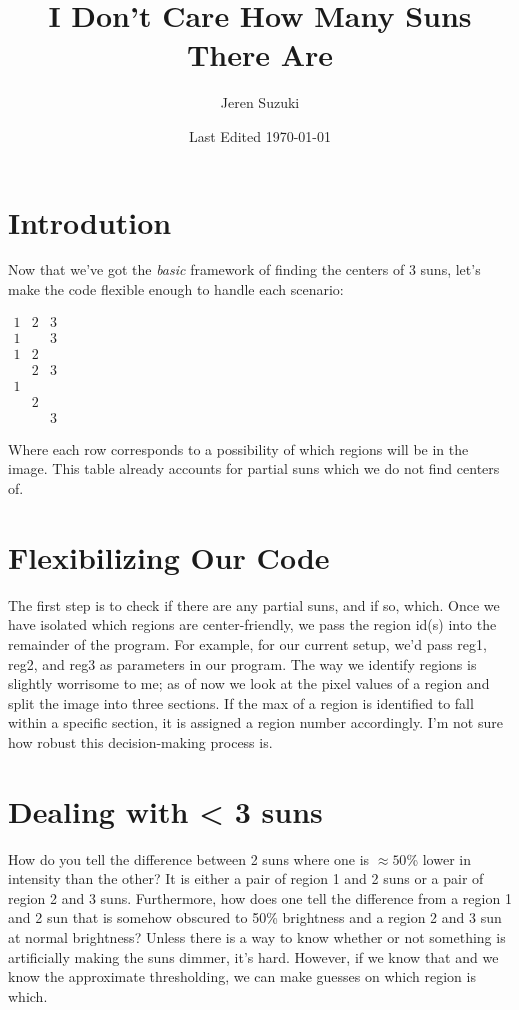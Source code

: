 \documentclass[10pt]{scrartcl}
\title{I Don't Care How Many Suns There Are}
\author{Jeren Suzuki}
\date{Last Edited \today}
\begin{document}
\maketitle
{}
\tableofcontents
\clearpage
{}

\section{Introdution} %
\label{sec:introdution}
    Now that we've got the \emph{basic} framework of finding the centers of 3 suns, let's make the code flexible enough to handle each scenario:\\
\begin{center}
    $\begin{matrix} 
    1 & 2 & 3 \\ 
    1 &   & 3 \\
    1 & 2 &   \\
      & 2 & 3 \\
    1 &   &   \\
      & 2 &   \\
      &   & 3
    \end{matrix}$
\end{center}

Where each row corresponds to a possibility of which regions will be in the image. This table already accounts for partial suns which we do not find centers of. 

\section{Flexibilizing Our Code} %
\label{sec:flexibilizing_our_code}

The first step is to check if there are any partial suns, and if so, which. Once we have isolated which regions are center-friendly, we pass the region id(s) into the remainder of the program. For example, for our current setup, we'd pass reg1, reg2, and reg3 as parameters in our program. The way we identify regions is slightly worrisome to me; as of now we look at the pixel values of a region and split the image into three sections. If the max of a region is identified to fall within a specific section, it is assigned a region number accordingly. I'm not sure how robust this decision-making process is.


\section{Dealing with < 3 suns} %
\label{sec:dealing_with_3_suns}
How do you tell the difference between 2 suns where one is $\approx 50$\% lower in intensity than the other? It is either a pair of region 1 and 2 suns or a pair of region 2 and 3 suns. Furthermore, how does one tell the difference from a region 1 and 2 sun that is somehow obscured to 50\% brightness and a region 2 and 3 sun at normal brightness? Unless there is a way to know whether or not something is artificially making the suns dimmer, it's hard. However, if we know that and we know the approximate thresholding, we can make guesses on which region is which.
\end{document}
